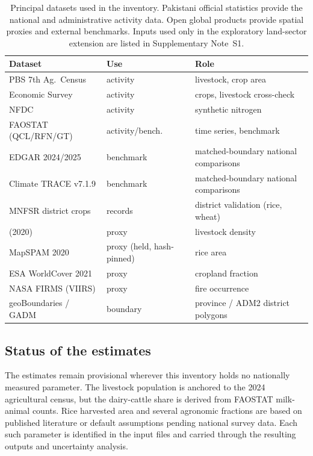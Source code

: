 \begin{table}[!htbp]
\centering
\footnotesize
\begin{tabularx}{\linewidth}{@{}llX@{}}
\toprule
\textbf{Dataset} & \textbf{Use} & \textbf{Role} \\
\midrule
PBS 7th Ag.\ Census & activity & livestock, crop area \\
Economic Survey & activity & crops, livestock cross-check \\
NFDC & activity & synthetic nitrogen \\
FAOSTAT (QCL/RFN/GT) & activity/bench. & time series, benchmark \\
EDGAR 2024/2025 & benchmark & matched-boundary national comparisons \\
Climate TRACE v7.1.9 & benchmark & matched-boundary national comparisons \\
MNFSR district crops & records & district validation (rice, wheat) \\
\GLW{} (2020) & proxy & livestock density \\
MapSPAM 2020 & proxy (held, hash-pinned) & rice area \\
ESA WorldCover 2021 & proxy & cropland fraction \\
NASA FIRMS (VIIRS) & proxy & fire occurrence \\
geoBoundaries / GADM & boundary & province / ADM2 district polygons \\
\bottomrule
\end{tabularx}
\caption{Principal datasets used in the inventory. Pakistani official statistics provide
the national and administrative activity data. Open global products provide spatial proxies
and external benchmarks. Inputs used only in the exploratory land-sector extension are
listed in Supplementary Note~S1.}
\label{tab:data}
\end{table}

\subsection{Status of the estimates}

The estimates remain provisional wherever this inventory holds no nationally measured
parameter. The
livestock population is anchored to the 2024 agricultural census, but the dairy-cattle share
is derived from FAOSTAT milk-animal counts. Rice harvested area and several agronomic
fractions are based on published literature or default assumptions pending national survey
data. Each such parameter is identified in the input files and carried through the resulting
outputs and uncertainty analysis.
